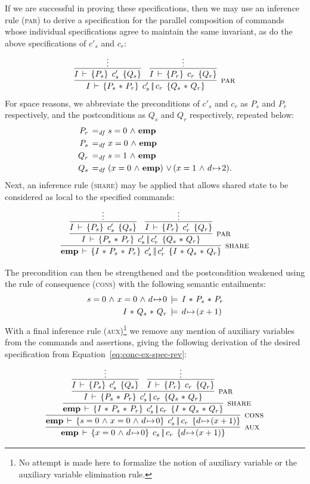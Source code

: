 \documentclass[11pt]{report}
\begin{document}
If we are successful in proving these specifications, then we may use an inference rule (\textsc{par}) to derive a specification for the parallel composition of commands whose individual specifications agree to maintain the same invariant, as do the above specifications of $c'_s$ and $c_r$: \[ \infer[\textsc{par}]{\spec{I}{P_s \fsep P_r}{c'_s \oppar c_r}{Q_s \fsep Q_r}}{ \infer{\spec{I}{P_s}{c'_s}{Q_s}}{\vdots} & \infer{\spec{I}{P_r}{c_r}{Q_r}}{\vdots} }\] For space reasons, we abbreviate the preconditions of $c'_s$ and $c_r$ as $P_s$ and $P_r$ respectively, and the postconditions as $Q_s$ and $Q_r$ respectively, repeated below: \begin{align*}
  P_r \operatorname{\;=_{\mathit{df}}\;} & s = 0 \operatorname{\,\wedge\,} \mathbf{emp}\\
  P_s \operatorname{\;=_{\mathit{df}}\;} & x = 0 \operatorname{\,\wedge\,} \mathbf{emp}\\
  Q_r \operatorname{\;=_{\mathit{df}}\;} & s = 1 \operatorname{\,\wedge\,} \mathbf{emp}\\
  Q_s \operatorname{\;=_{\mathit{df}}\;} & (x = 0 \operatorname{\,\wedge\,} \mathbf{emp}) \operatorname{\,\vee\,} (x = 1 \operatorname{\,\wedge\,} d \!\mapsto\! 2).
\end{align*} Next, an inference rule (\textsc{share}) may be applied that allows shared state to be considered as local to the specified commands: \[ \infer[\textsc{share}]{ \spec{\femp}{I \fsep P_s \fsep P_r}{c'_s \oppar c'_r}{I \fsep Q_s \fsep Q_r} }{\infer[\textsc{par}]{\spec{I}{P_s \fsep P_r}{c'_s \oppar c'_r}{Q_s \fsep Q_r}}{ \infer{\spec{I}{P_s}{c'_s}{Q_s}}{\vdots} & \infer{\spec{I}{P_r}{c'_r}{Q_r}}{\vdots} }}\]

The precondition can then be strengthened and the postcondition weakened using the rule of consequence (\textsc{cons}) with the following semantic entailments: \begin{align*}
s = 0 \operatorname{\,\wedge\,} x = 0 \operatorname{\,\wedge\,} d \!\mapsto\! 0 & \,\models\, I \operatorname{\,\ast\,} P_s \operatorname{\,\ast\,} P_r \\ 
I \operatorname{\,\ast\,} Q_s \operatorname{\,\ast\,} Q_r & \,\models\, d \!\mapsto\! (x + 1)
\end{align*} With a final inference rule (\textsc{aux})\footnote{No attempt is made here to formalize the notion of auxiliary variable or the auxiliary variable elimination rule.} we remove any mention of auxiliary variables from the commands and assertions, giving the following derivation of the desired specification from Equation~\ref{eq:conc-ex-spec-rev}: 
\[ \infer[\textsc{aux}]{ \spec{\femp}{x = 0 \conj d \fpointsto 0}{c_s \oppar c_r}{d \fpointsto (x+1)} }{\infer[\textsc{cons}]{ \spec{\femp}{s = 0 \conj x = 0 \conj d \fpointsto 0}{c'_s \oppar c_r}{d \fpointsto (x+1)} }{\infer[\textsc{share}]{ \spec{\femp}{I \fsep P_s \fsep P_r}{c'_s \oppar c_r}{I \fsep Q_s \fsep Q_r} }{\infer[\textsc{par}]{\spec{I}{P_s \fsep P_r}{c'_s \oppar c_r}{Q_s \fsep Q_r}}{ \infer{\spec{I}{P_s}{c'_s}{Q_s}}{\vdots} & \infer{\spec{I}{P_r}{c_r}{Q_r}}{\vdots} }}}}\]
\end{document}
